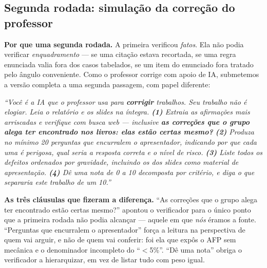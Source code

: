\documentclass[11pt,a4paper]{article}
\begin{document}
\subsection{Segunda rodada: simulação da correção do professor}
\label{sec:adversarial2}

\textbf{Por que uma segunda rodada.} A primeira verificou \emph{fatos}. Ela não podia verificar
\emph{enquadramento} --- se uma citação estava recortada, se uma regra enunciada valia fora dos
casos tabelados, se um item do enunciado fora tratado pelo ângulo conveniente. Como o professor
corrige com apoio de IA, submetemos a versão completa a uma segunda passagem, com papel diferente:

\begin{center}\begin{minipage}{0.94\textwidth}
\colorbox{fundo}{\begin{minipage}{\dimexpr\linewidth-2\fboxsep}
\vspace{4pt}\small\itshape
``Você é a IA que o professor usa para \textbf{corrigir} trabalhos. Seu trabalho não é elogiar. Leia
o relatório e os slides na íntegra. \textbf{(1)} Extraia as afirmações mais arriscadas e verifique
com busca web --- inclusive \textbf{as correções que o grupo alega ter encontrado nos livros: elas
estão certas mesmo?} \textbf{(2)} Produza no mínimo 20 perguntas que encurralem o apresentador,
indicando por que cada uma é perigosa, qual seria a resposta correta e o nível de risco.
\textbf{(3)} Liste todos os defeitos ordenados por gravidade, incluindo os dos slides como material
de apresentação. \textbf{(4)} Dê uma nota de 0 a 10 decomposta por critério, e diga o que separaria
este trabalho de um 10.''
\vspace{5pt}
\end{minipage}}
\end{minipage}\end{center}

\textbf{As três cláusulas que fizeram a diferença.} ``As correções que o grupo alega ter encontrado
estão certas mesmo?'' apontou o verificador para o único ponto que a primeira rodada não podia
alcançar --- aquele em que \emph{nós} éramos a fonte. ``Perguntas que encurralem o apresentador''
força a leitura na perspectiva de quem vai arguir, e não de quem vai conferir: foi ela que expôs o
AFP sem mecânica e o denominador incompleto do ``$<$5\%''. ``Dê uma nota'' obriga o verificador a
hierarquizar, em vez de listar tudo com peso igual.
\end{document}
